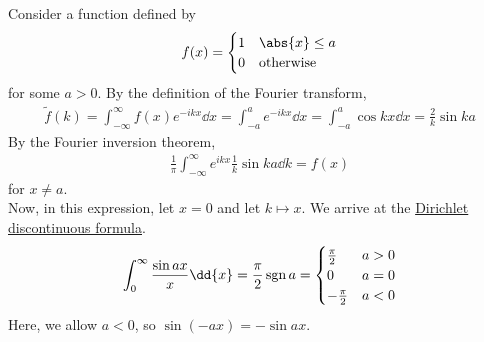 \begin{example}
	Consider a function defined by
	\begin{align*}
		f(x) = \begin{cases}
			1 & \abs{x} \leq a   \\
			0 & \text{otherwise}
		\end{cases}
	\end{align*}
	for some $a > 0$.
	By the definition of the Fourier transform,
	\begin{align} \label{eq:8.15}
		\widetilde f(k) = \int_{-\infty}^\infty f(x) e^{-ikx} \dd{x} = \int_{-a}^a e^{-ikx} \dd{x} = \int_{-a}^a \cos kx \dd{x} = \frac{2}{k} \sin ka
	\end{align}
	By the Fourier inversion theorem,
	\begin{align*}
		\frac{1}{\pi} \int_{-\infty}^\infty e^{ikx} \frac{1}{k} \sin ka \dd{k} = f(x)
	\end{align*}
	for $x \neq a$. \\
	Now, in this expression, let $x = 0$ and let $k \mapsto x$.
	We arrive at the \underline{Dirichlet discontinuous formula}.
	\begin{align} \label{eq:8.16}
		\int_0^\infty \frac{\sin ax}{x} \dd{x} = \frac{\pi}{2} \sgn a = \begin{cases}
			\frac{\pi}{2}  & a > 0 \\
			0              & a = 0 \\
			-\frac{\pi}{2} & a < 0
		\end{cases}
	\end{align}
	Here, we allow $a < 0$, so $\sin(-ax) = -\sin ax$.
\end{example}

